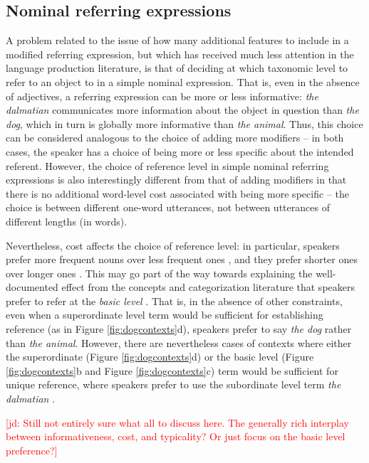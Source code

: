 \documentclass[11pt]{article}
\newcommand{\jd}[1]{\textcolor{Red}{[jd: #1]}}
\newcommand{\figref}[1]{Figure \ref{#1}}
\begin{document}
\subsection{Nominal referring expressions}
\label{sec:nominal}

A problem related to the issue of how many additional features to include in a modified referring expression, but which has received much less attention in the language production literature, is that of deciding at which taxonomic level to refer to an object to in a simple nominal expression. That is, even in the absence of adjectives, a referring expression can be more or less informative: \emph{the dalmatian} communicates more information about the object in question than \emph{the dog}, which in turn is globally more informative than \emph{the animal}. Thus, this choice can be considered analogous to the choice of adding more modifiers -- in both cases, the speaker has a choice of being more or less specific about the intended referent. However, the choice of reference level in simple nominal referring expressions is also interestingly different from that of adding modifiers in that there is no additional word-level cost associated with being more specific -- the choice is between different one-word utterances, not between utterances of different lengths (in words). 

Nevertheless, cost affects the choice of reference level: in particular, speakers prefer more frequent nouns over less frequent ones \cite{bla}, and they prefer shorter ones over longer ones \cite{bla}. This may go part of the way towards explaining the well-documented effect from the concepts and categorization literature that speakers prefer to refer at the \emph{basic level} \cite{Rosch1976}. That is, in the absence of other constraints, even when a superordinate level term would be sufficient for establishing reference (as in \figref{fig:dogcontexts}d), speakers prefer to say \emph{the dog} rather than \emph{the animal}. However, there are nevertheless cases  of contexts where either the superordinate (\figref{fig:dogcontexts}d) or the basic level (\figref{fig:dogcontexts}b and \figref{fig:dogcontexts}c) term would be sufficient for unique reference, where speakers prefer to use the subordinate level term \emph{the dalmatian} \cite{someone who discusses typicality?}.



\jd{Still not entirely sure what all to discuss here. The generally rich interplay between informativeness, cost, and typicality? Or just focus on the basic level preference?}
\end{document}
